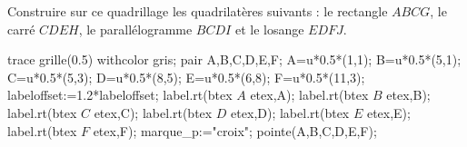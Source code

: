 \begin{exercice*} %
   Construire sur ce quadrillage les quadrilatères suivants : le rectangle $ABCG$, le carré $CDEH$, le parallélogramme $BCDI$ et le losange $EDFJ$. 
   \vspace*{-2mm}
   \begin{center}
      \begin{Geometrie}[CoinHD={(6u,4.5u)}]
         trace grille(0.5) withcolor gris;
         pair A,B,C,D,E,F;
         A=u*0.5*(1,1);
         B=u*0.5*(5,1);
         C=u*0.5*(5,3);
         D=u*0.5*(8,5);
         E=u*0.5*(6,8);
         F=u*0.5*(11,3);
         labeloffset:=1.2*labeloffset;
         label.rt(btex $A$ etex,A);
         label.rt(btex $B$ etex,B);
         label.rt(btex $C$ etex,C);
         label.rt(btex $D$ etex,D);
         label.rt(btex $E$ etex,E);
         label.rt(btex $F$ etex,F);
         marque_p:="croix";         
         pointe(A,B,C,D,E,F);
      \end{Geometrie}
   \end{center} 
   \vspace*{-5mm}
\end{exercice*}
